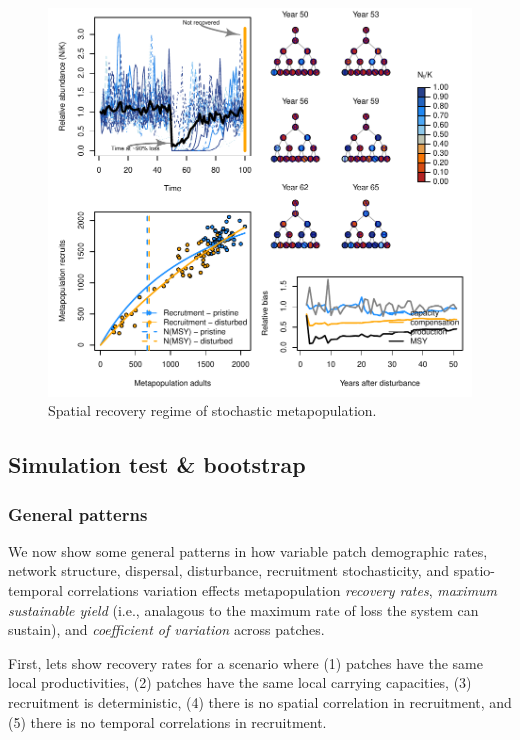 \documentclass[]{article}
\begin{document}
\begin{figure}[H]

{\centering \includegraphics{Managing_for_ecological_surprises_in_metapopulations_makeHTML_files/figure-latex/example results4-1} 

}

\caption{Spatial recovery regime of stochastic metapopulation.}\label{fig:example results4}
\end{figure}

\subsection{Simulation test \&
bootstrap}\label{simulation-test-bootstrap}

\subsubsection{General patterns}\label{general-patterns}

We now show some general patterns in how variable patch demographic
rates, network structure, dispersal, disturbance, recruitment
stochasticity, and spatio-temporal correlations variation effects
metapopulation \emph{recovery rates}, \emph{maximum sustainable yield}
(i.e., analagous to the maximum rate of loss the system can sustain),
and \emph{coefficient of variation} across patches.

First, lets show recovery rates for a scenario where (1) patches have
the same local productivities, (2) patches have the same local carrying
capacities, (3) recruitment is deterministic, (4) there is no spatial
correlation in recruitment, and (5) there is no temporal correlations in
recruitment.
\end{document}

